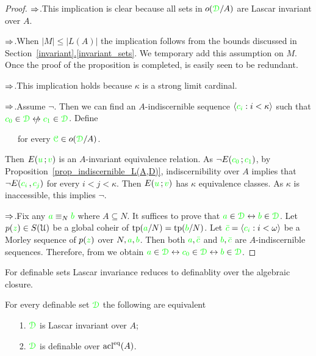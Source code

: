 \documentclass[creche.tex]{subfiles}
\begin{document}
\begin{proof}
  $\Rightarrow$.\quad This implication is clear because all sets in $o({\color{green}\EuScript D}/A)$ are Lascar invariant over $A$. 
  
  $\Rightarrow$.\quad When $|M|\le|L(A)|$ the implication follows from the bounds discussed in Section~\hyperref[invariant_sets]{\ref*{invariant}.\ref*{invariant_sets}}. We temporary add this assumption on $M$. Once the proof of the proposition is completed, is easily seen to be redundant. 
  
  $\Rightarrow$.\quad This implication holds because $\kappa$ is a strong limit cardinal.

  $\Rightarrow$.\quad Assume $\neg$. Then we can find an  $A\mbox{-}$indiscernible sequence $\langle{\color{green}c_i}:i<\kappa\rangle$ such that ${\gr c_0}\in\grD\niff {\gr c_1}\in\grD$. Define

  \ \ \ for every ${\color{green}\EuScript C}\in o({\color{green}\EuScript D}/A)$.

  Then $E({\color{green} u}\,;{\color{green} v})$ is an $A\mbox{-}$invariant equivalence relation. As $\neg E({\color{green} c_0}\,;{\color{green} c_1})$, by Proposition~\ref{prop_indiscernible_L(A,D)}, indiscernibility over $A$ implies that $\neg E({\color{green} c_i\,},{\color{green} c_j})$ for every $i<j<\kappa$. Then $E({\color{green} u}\,;{\color{green} v})$ has $\kappa$ equivalence classes. As $\kappa$ is inaccessible, this implies $\neg$.

  $\Rightarrow$.\quad Fix any ${\color{green} a}\equiv_N{\color{green} b}$ where $A\subseteq N$. It suffices to prove that ${\color{green} a}\in{\color{green}\EuScript D}\leftrightarrow{\color{green}b}\in{\color{green}\EuScript D}$. Let $p({\color{green} z})\in S(\EuScript U)$ be a global coheir of ${\rm tp}({\color{green} a}/N)={\rm tp}({\color{green} b}/N)$. Let ${\color{green}\bar c}=\langle{\color{green}c_i}:i<\omega\rangle$ be a Morley sequence of $p({\color{green} z})$ over $N,{\color{green} a},{\color{green} b}$. Then both ${\color{green} a},{\color{green}\bar c}$ and ${\color{green} b},{\color{green}\bar c}$ are $A\mbox{-}$indiscernible sequences. Therefore, from  we obtain ${\color{green} a}\in{\color{green}\EuScript D}\leftrightarrow{\color{green}c_0}\in{\color{green}\EuScript D}\leftrightarrow{\color{green}b}\in{\color{green}\EuScript D}$. 
\end{proof}

For definable sets Lascar invariance reduces to definablity over the algebraic closure.

\begin{corollary}
For every definable set ${\color{green}\EuScript D}$ the following are equivalent
  \begin{itemize}
    \item[1.] ${\color{green}\EuScript D}$ is Lascar invariant over $A$;
    \item[2.] ${\color{green}\EuScript D}$ is definable over $\mathop{\rm acl}^{{\rm eq}}(A)$.\QED
  \end{itemize}
\end{corollary}
\end{document}
